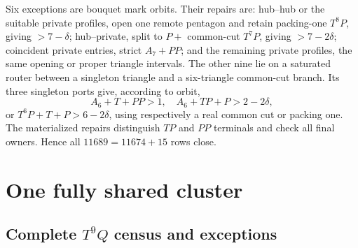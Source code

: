 \documentclass[11pt]{article}
\begin{document}
Six exceptions are bouquet mark orbits.  Their repairs are: hub--hub or the
suitable private profiles, open one remote pentagon and retain packing-one
$T^8P$, giving $>7-\delta$; hub--private, split to
$P+$ common-cut $T^7P$, giving $>7-2\delta$; coincident private entries, strict
$A_7+PP$; and the remaining private profiles, the same opening or proper
triangle intervals.  The other nine lie on a saturated router between a
singleton triangle and a six-triangle common-cut branch.  Its three singleton
ports give, according to orbit,
\[
 A_6+T+PP>1,\quad A_6+TP+P>2-2\delta,
\]
or $T^6P+T+P>6-2\delta$, using respectively a real common cut or packing one.
The materialized repairs distinguish $TP$ and $PP$ terminals and check all
final owners.  Hence all $11689=11674+15$ rows close.

\section{One fully shared cluster}

\subsection{Complete \texorpdfstring{$T^9Q$}{T9Q} census and exceptions}
\end{document}
